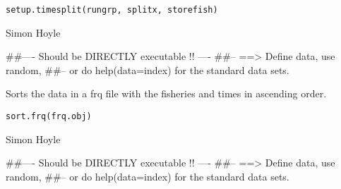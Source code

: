\documentclass[a4paper]{book}
\begin{document}
%
\begin{Usage}
\begin{verbatim}
setup.timesplit(rungrp, splitx, storefish)
\end{verbatim}
\end{Usage}
%
\begin{Arguments}
\begin{ldescription}
\item[\code{rungrp}] 


\item[\code{splitx}] 


\item[\code{storefish}] 


\end{ldescription}
\end{Arguments}
%
\begin{Author}\relax

Simon Hoyle
\end{Author}
%
\begin{Examples}
\begin{ExampleCode}
##---- Should be DIRECTLY executable !! ----
##-- ==>  Define data, use random,
##--	or do  help(data=index)  for the standard data sets.

\end{ExampleCode}
\end{Examples}
%
\begin{Description}\relax

Sorts the data in a frq file with the fisheries and times in ascending order. 
\end{Description}
%
\begin{Usage}
\begin{verbatim}
sort.frq(frq.obj)
\end{verbatim}
\end{Usage}
%
\begin{Arguments}
\begin{ldescription}
\item[\code{frq.obj}] 


\end{ldescription}
\end{Arguments}
%
\begin{Author}\relax

Simon Hoyle
\end{Author}
%
\begin{Examples}
\begin{ExampleCode}
##---- Should be DIRECTLY executable !! ----
##-- ==>  Define data, use random,
##--	or do  help(data=index)  for the standard data sets.

\end{ExampleCode}
\end{Examples}
\end{document}
